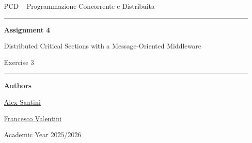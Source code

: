 \begin{titlepage}
    \centering
    \vspace*{2.2cm}

    {\Large PCD -- Programmazione Concorrente e Distribuita\par}
    \vspace{1.2cm}
    {\rule{0.82\textwidth}{0.5pt}\par}
    \vspace{0.9cm}
    {\huge\bfseries Assignment 4\par}
    \vspace{0.35cm}
    {\LARGE Distributed Critical Sections with a Message-Oriented Middleware\par}
    \vspace{0.25cm}
    {\large Exercise 3\par}
    \vspace{0.9cm}
    {\rule{0.82\textwidth}{0.5pt}\par}

    \vspace{1.6cm}
    {\large\textbf{Authors}\par}
    \vspace{0.25cm}
    {\large \href{https://github.com/AlexSantini10}{Alex Santini}\par}
    {\large \href{https://github.com/Val0rous}{Francesco Valentini}\par}

    \vfill
    {\large Academic Year 2025/2026\par}
    {\large \todayFullUK\par}
\end{titlepage}
